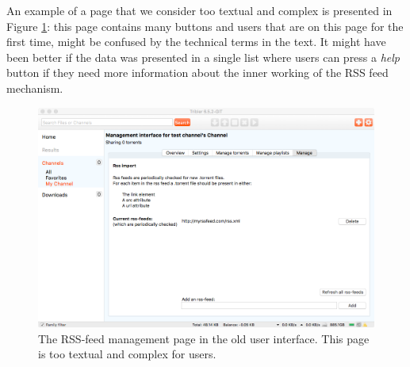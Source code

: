 An example of a page that we consider too textual and complex is presented in Figure \ref{fig:old-interface-rss-page}: this page contains many buttons and users that are on this page for the first time, might be confused by the technical terms in the text. It might have been better if the data was presented in a single list where users can press a \emph{help} button if they need more information about the inner working of the RSS feed mechanism.\\

\begin{figure}[t]
	\centering
	\includegraphics[width=1.0\columnwidth]{images/implementation/old_gui}
	\caption{The RSS-feed management page in the old user interface. This page is too textual and complex for users.}
	\label{fig:old-interface-rss-page}
\end{figure}


